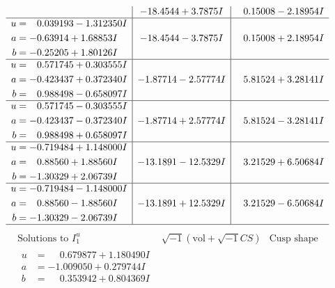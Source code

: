 \documentclass[1p]{elsarticle_modified}
\theoremstyle{definition}
\newcommand{\I}{\sqrt{-1}}
\begin{document}
$$\begin{array}{c|c|c}
 & -18.4544 + 3.7875 I & \phantom{-}0.15008 - 2.18954 I \\ \hline\begin{aligned}
u &= \phantom{-}0.039193 - 1.312350 I \\
a &= -0.63914 + 1.68853 I \\
b &= -0.25205 + 1.80126 I\end{aligned}
 & -18.4544 - 3.7875 I & \phantom{-}0.15008 + 2.18954 I \\ \hline\begin{aligned}
u &= \phantom{-}0.571745 + 0.303555 I \\
a &= -0.423437 + 0.372340 I \\
b &= \phantom{-}0.988498 - 0.658097 I\end{aligned}
 & -1.87714 - 2.57774 I & \phantom{-}5.81524 + 3.28141 I \\ \hline\begin{aligned}
u &= \phantom{-}0.571745 - 0.303555 I \\
a &= -0.423437 - 0.372340 I \\
b &= \phantom{-}0.988498 + 0.658097 I\end{aligned}
 & -1.87714 + 2.57774 I & \phantom{-}5.81524 - 3.28141 I \\ \hline\begin{aligned}
u &= -0.719484 + 1.148000 I \\
a &= \phantom{-}0.88560 + 1.88560 I \\
b &= -1.30329 + 2.06739 I\end{aligned}
 & -13.1891 - 12.5329 I & \phantom{-}3.21529 + 6.50684 I \\ \hline\begin{aligned}
u &= -0.719484 - 1.148000 I \\
a &= \phantom{-}0.88560 - 1.88560 I \\
b &= -1.30329 - 2.06739 I\end{aligned}
 & -13.1891 + 12.5329 I & \phantom{-}3.21529 - 6.50684 I\\
 \hline 
 \end{array}$$\newpage$$\begin{array}{c|c|c}  
\text{Solutions to }I^u_{1}& \I (\text{vol} + \sqrt{-1}CS) & \text{Cusp shape}\\
 \hline 
\begin{aligned}
u &= \phantom{-}0.679877 + 1.180490 I \\
a &= -1.009050 + 0.279744 I \\
b &= \phantom{-}0.353942 + 0.804369 I\end{aligned}

\end{array}$$
\end{document}
